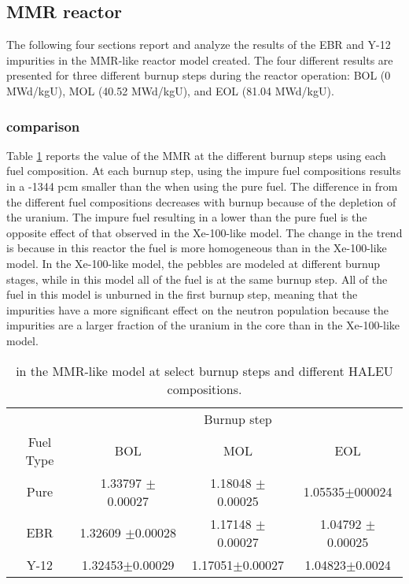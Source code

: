\subsection{MMR reactor}
The following four sections report and analyze the results of the 
\gls{EBR} and Y-12 impurities in the \gls{MMR}-like reactor model 
created. The four different results are presented for three different 
burnup steps during the reactor operation: \gls{BOL} (0 MWd/kgU),
\gls{MOL} (40.52 MWd/kgU), and \gls{EOL} (81.04 MWd/kgU). 

\subsubsection{\keff comparison}

Table \ref{tab:mmr_keff} reports the \keff value of the \gls{MMR} at the 
different burnup steps using each fuel composition. At each burnup step, 
using the impure fuel compositions results in a -1344 pcm 
smaller than the \keff when using the pure fuel. The difference in \keff 
from the different fuel compositions decreases with burnup because of 
the depletion of the uranium. The impure fuel resulting in a lower \keff 
than the pure fuel is the opposite 
effect of that observed in the Xe-100-like model. The change in the trend 
is because in this reactor the fuel is more homogeneous than in 
the Xe-100-like model. In the Xe-100-like model, the pebbles are modeled 
at different burnup stages, while in this model all of the fuel is at the 
same burnup step. All of the fuel in this model is unburned in the 
first burnup step, meaning that the impurities have a more significant 
effect on the neutron population because the impurities are a larger fraction 
of the uranium in the core than in the Xe-100-like model.

\begin{table}[ht]
        \centering
        \caption{\keff in the \gls{MMR}-like model at select burnup 
        steps and different \gls{HALEU} compositions.}
        \label{tab:mmr_keff}
        \begin{tabular}{c c c c}
                \hline 
                & \multicolumn{3}{c}{Burnup step}\\
                Fuel Type & \gls{BOL} & \gls{MOL} & \gls{EOL} \\
                \hline 
                Pure & 1.33797 $\pm$ 0.00027 & 1.18048 $\pm$ 0.00025 & 1.05535$\pm$000024\\
                \gls{EBR} & 1.32609 $\pm$0.00028 & 1.17148 $\pm$ 0.00027 & 1.04792 $\pm$ 0.00025 \\
                Y-12 & 1.32453$\pm$0.00029 & 1.17051$\pm$0.00027 & 1.04823$\pm$0.0024\\
                \hline
                
        \end{tabular}
\end{table}

